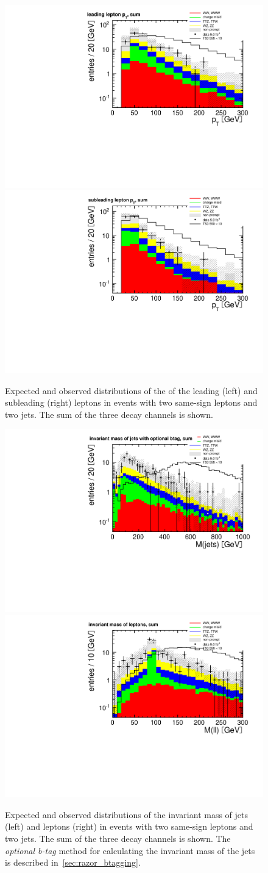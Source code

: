 \begin{figure}[htb]
    \centering
    \includegraphics[width=.49\textwidth]{images/pdf/same-sign,_2_jets/lep_pt_1_sum_1}
    \includegraphics[width=.49\textwidth]{images/pdf/same-sign,_2_jets/lep_pt_2_sum_1}
    \caption{Expected and observed distributions of the \pt of the leading
    (left) and subleading (right) leptons in events with two same-sign leptons
and two jets. The sum of the three decay channels is shown. }
    \label{fig:lep_pt}
\end{figure}

\begin{figure}[htb]
    \centering
    \includegraphics[width=.49\textwidth]{images/pdf/same-sign,_2_jets/had_mass_optional_btag_sum_1}
    \includegraphics[width=.49\textwidth]{images/pdf/same-sign,_2_jets/lep_mass_sum_1}
    \caption{Expected and observed distributions of the invariant mass of
        jets (left) and leptons (right) in events with two same-sign leptons
        and two jets. The sum of the three decay channels is shown. The \emph{optional b-tag} method for calculating the
        invariant mass of the jets is described in~\ref{sec:razor_btagging}.}
    \label{fig:masses}
\end{figure}
